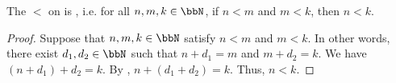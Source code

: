 \begin{lemma} \label{lemma:standard_order_on_natural_numbers_is_transitive}
    The  $<$ on  is , i.e. for all $n,m,k \in \bbN$, if $n < m$ and $m < k$, then $n < k$. 
\end{lemma}
\begin{proof}
    Suppose that $n,m,k \in \bbN$ satisfy $n < m$ and $m < k$. In other words, there exist $d_1,d_2 \in \bbN$ such that $n + d_1 = m$ and $m + d_2 = k$. We have $(n+d_1)+d_2 = k$. By , $n+(d_1+d_2) = k$. Thus, $n < k$.
\end{proof}
